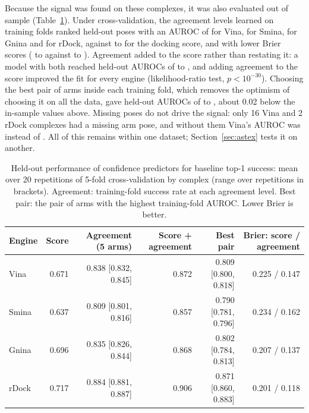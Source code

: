 Because the signal was found on these complexes, it was also evaluated out of sample
(Table~\ref{tab:agreement-cv}). Under cross-validation, the agreement levels learned on
training folds ranked held-out poses with an AUROC of  for Vina,  for Smina, 
for Gnina and  for rDock, against  to  for the docking score, and with lower
Brier scores ( to  against  to ). Agreement added to the score rather
than restating it: a model with both reached held-out AUROCs of  to , and adding
agreement to the score improved the fit for every engine (likelihood-ratio test, $p <
10^{-30}$). Choosing the best pair of arms inside each training fold, which removes the
optimism of choosing it on all the data, gave held-out AUROCs of  to , about 0.02
below the in-sample values above. Missing poses do not drive the signal: only 16 Vina and 2
rDock complexes had a missing arm pose, and without them Vina's AUROC was  instead of
. All of this remains within one dataset; Section~\ref{sec:astex} tests it on another.

\begin{table}[h]
  \centering
  \caption{Held-out performance of confidence predictors for baseline top-1 success: mean
    over 20 repetitions of 5-fold cross-validation by complex (range over repetitions in
    brackets). Agreement: training-fold success rate at each agreement level. Best pair:
    the pair of arms with the highest training-fold AUROC. Lower Brier is better.}
  \label{tab:agreement-cv}
  \small
  \setlength{\tabcolsep}{4pt}
  \begin{tabular}{lrrrrr}
    \toprule
    Engine & Score & Agreement (5 arms) & Score + agreement & Best pair & Brier: score / agreement \\
    \midrule
    Vina & 0.671 & 0.838 [0.832, 0.845] & 0.872 & 0.809 [0.800, 0.818] & 0.225 / 0.147 \\
    Smina & 0.637 & 0.809 [0.801, 0.816] & 0.857 & 0.790 [0.781, 0.796] & 0.234 / 0.162 \\
    Gnina & 0.696 & 0.835 [0.826, 0.844] & 0.868 & 0.802 [0.784, 0.813] & 0.207 / 0.137 \\
    rDock & 0.717 & 0.884 [0.881, 0.887] & 0.906 & 0.871 [0.860, 0.883] & 0.201 / 0.118 \\
    \bottomrule
  \end{tabular}
\end{table}

